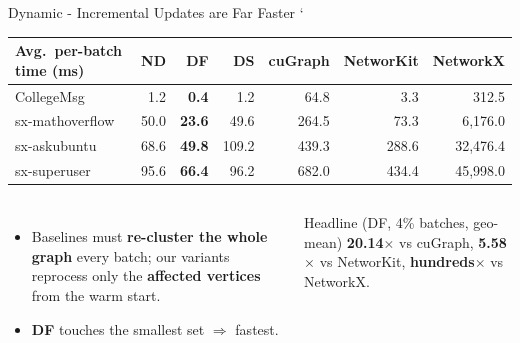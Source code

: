 \documentclass[aspectratio=169]{beamer}
\newcommand{\win}[1]{\textcolor{green!50!black}{\textbf{#1}}}
\begin{document}
\begin{frame}{Dynamic - Incremental Updates are Far Faster}
`    \footnotesize
    \begin{center}
    \begin{tabular}{lrrrrrr}
        \toprule
        \textbf{Avg.\ per-batch time (ms)} & \textbf{ND} & \win{\textbf{DF}} & \textbf{DS}
            & \textbf{cuGraph} & \textbf{NetworKit} & \textbf{NetworkX} \\
        \midrule
        CollegeMsg       & 1.2  & \win{0.4}  & 1.2   & 64.8  & 3.3   & 312.5 \\
        sx-mathoverflow  & 50.0 & \win{23.6} & 49.6  & 264.5 & 73.3  & 6{,}176.0 \\
        sx-askubuntu     & 68.6 & \win{49.8} & 109.2 & 439.3 & 288.6 & 32{,}476.4 \\
        sx-superuser     & 95.6 & \win{66.4} & 96.2  & 682.0 & 434.4 & 45{,}998.0 \\
        \bottomrule
    \end{tabular}
    \end{center}
    \vspace{0.2em}
    \begin{columns}
        \begin{itemize}\small
            \item Baselines must \textbf{re-cluster the whole graph} every batch; our variants
            reprocess only the \textbf{affected vertices} from the warm start.
            \item \textbf{DF} touches the smallest set $\Rightarrow$ fastest.
        \end{itemize}
        \begin{block}{Headline (DF, 4\% batches, geo-mean)}
        \small \textbf{20.14$\times$} vs cuGraph, \textbf{5.58$\times$} vs NetworKit,
        \textbf{hundreds$\times$} vs NetworkX.
        \end{block}
    \end{columns}
\end{frame}
\end{document}

